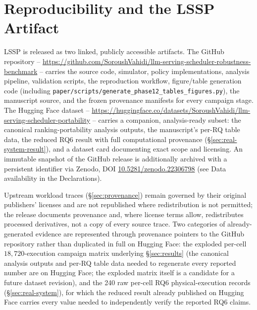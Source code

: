 \section{Reproducibility and the LSSP Artifact}
\label{sec:artifact}

LSSP is released as two linked, publicly accessible artifacts. The GitHub
repository -- \url{https://github.com/SoroushVahidi/llm-serving-scheduler-robustness-benchmark}
-- carries the source code, simulator, policy implementations, analysis
pipeline, validation scripts, the reproduction workflow, figure/table
generation code (including
\texttt{paper/scripts/generate\_phase12\_tables\_figures.py}), the manuscript
source, and the frozen provenance manifests for every campaign stage. The Hugging
Face dataset -- \url{https://huggingface.co/datasets/SoroushVahidi/llm-serving-scheduler-portability}
-- carries a companion, analysis-ready subset: the canonical
ranking-portability analysis outputs, the manuscript's per-RQ table data,
the reduced RQ6 result with full computational provenance
(\S\ref{sec:real-system-result}), and a dataset card documenting exact
scope and licensing. An immutable snapshot of the GitHub release is
additionally archived with a persistent identifier via Zenodo, DOI
\href{https://doi.org/10.5281/zenodo.22306798}{10.5281/zenodo.22306798}
(see Data availability in the Declarations).

Upstream workload traces (\S\ref{sec:provenance}) remain governed by their
original publishers' licenses and are not republished where redistribution
is not permitted; the release documents provenance and, where license
terms allow, redistributes processed derivatives, not a copy of every
source trace. Two categories of already-generated evidence are
represented through provenance pointers to the GitHub repository rather
than duplicated in full on Hugging Face: the exploded per-cell
$18{,}720$-execution campaign matrix underlying \S\ref{sec:results} (the
canonical analysis outputs and per-RQ table data needed to regenerate
every reported number are on Hugging Face; the exploded matrix itself is
a candidate for a future dataset revision), and the 240 raw per-cell RQ6
physical-execution records (\S\ref{sec:real-system}), for which the
reduced result already published on Hugging Face carries every value
needed to independently verify the reported RQ6 claims.

